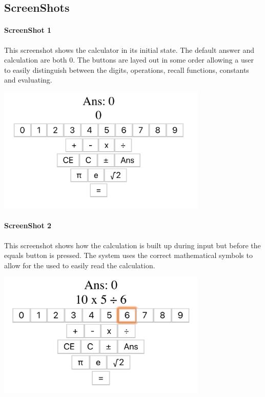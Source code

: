 \documentclass[a4paper]{article}
\begin{document}
\subsection{ScreenShots}
\paragraph{ScreenShot 1}
This screenshot shows the calculator in its initial state.
The default answer and calculation are both 0.
The buttons are layed out in some order allowing a user to easily distinguish between the digits, operations, recall functions, constants and evaluating.
\begin{center}
    \includegraphics[width=10cm]{Suppliments/calculator1.png}
\end{center}
\paragraph{ScreenShot 2}
This screenshot shows how the calculation is built up during input but before the equals button is pressed.
The system uses the correct mathematical symbols to allow for the used to easily read the calculation.
\begin{center}
    \includegraphics[width=10cm]{Suppliments/calculator2.png}
\end{center}
\end{document}
